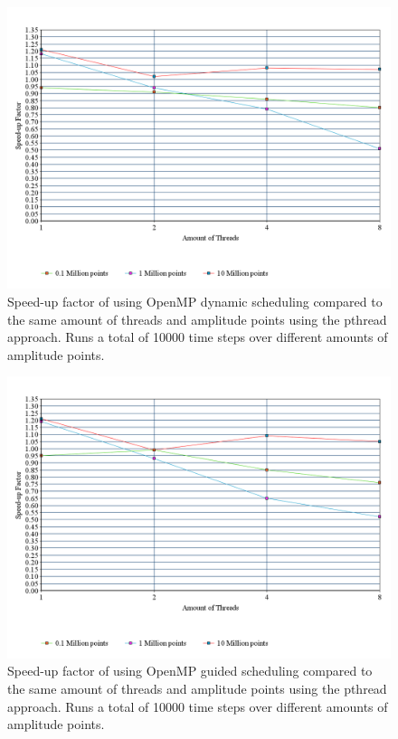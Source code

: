 \documentclass[a4paper,12px]{article}
\begin{document}
\begin{figure}[H]
    \centering
    \includegraphics[width=\textwidth]{dynamic}
    \caption{Speed-up factor of using OpenMP dynamic scheduling compared to the
    same amount of threads and amplitude points using the pthread approach. Runs
    a total of 10000 time steps over different amounts of amplitude points.}
\end{figure}

\begin{figure}[H]
    \centering
    \includegraphics[width=\textwidth]{guided}
    \caption{Speed-up factor of using OpenMP guided scheduling compared to the
    same amount of threads and amplitude points using the pthread approach. Runs
    a total of 10000 time steps over different amounts of amplitude points.}
\end{figure}
\end{document}
